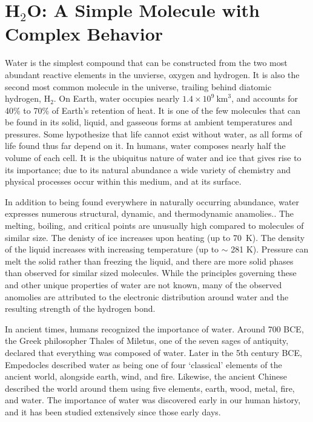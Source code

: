 \section{H$_2$O: A Simple Molecule with Complex Behavior}
Water is the simplest compound that can be constructed from the two
most abundant reactive elements in the unvierse, oxygen and
hydrogen. It is also the second most common molecule in the universe,
trailing behind diatomic hydrogen, $\mathrm{H}_2$.  On Earth, water
occupies nearly $1.4\times 10^{9}~\mathrm{km}^{3}$\cite{Brown2016},
and accounts for 40\% to 70\% of Earth's retention of heat. It is one
of the few molecules that can be found in its solid, liquid, and
gasseous forms at ambient temperatures and pressures.  Some
hypothesize that life cannot exist without water, as all forms of life
found thus far depend on it.\cite{Caldecott2008,Henry2005} In humans,
water composes nearly half the volume of each cell.\cite{Ling2004} It
is the ubiquitus nature of water and ice that gives rise to its
importance; due to its natural abundance a wide variety of chemistry
and physical processes occur within this medium, and at its surface.

In addition to being found everywhere in naturally occurring
abundance, water expresses numerous structural, dynamic, and
thermodynamic anamolies.\cite{Brovchenko2008}. The melting, boiling,
and critical points are unusually high compared to molecules of
similar size. The denisty of ice increases upon heating (up to
70~K). The density of the liquid increases with increasing temperature
(up to $\sim$ 281 K). Pressure can melt the solid rather than freezing
the liquid, and there are more solid phases than observed for similar
sized molecules. While the principles governing these and other
unique properties of water are not known, many of the observed
anomolies are attributed to the electronic distribution around water
and the resulting strength of the hydrogen bond.

In ancient times, humans recognized the importance of water. Around
700 BCE, the Greek philosopher Thales of Miletus, one of the seven
sages of antiquity, declared that everything was composed of
water. Later in the 5th century BCE, Empedocles described water as
being one of four `classical' elements of the ancient world, alongside
earth, wind, and fire. Likewise, the ancient Chinese described the
world around them using five elements, earth, wood, metal, fire, and
water. The importance of water was discovered early in our human
history, and it has been studied extensively since those early days.

